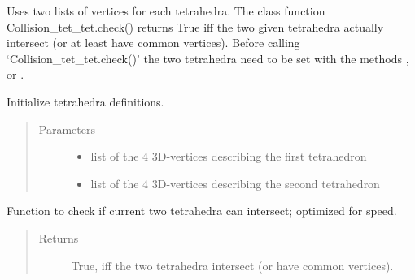 \documentclass[letterpaper,10pt,english]{sphinxmanual}
\begin{document}
Uses two lists of vertices for each tetrahedra. The class function Collision\_tet\_tet.check() returns True iff the two given tetrahedra actually intersect (or at least have common vertices).
Before calling ‘Collision\_tet\_tet.check()’ the two tetrahedra need to be set with the methods ,  or .

\begin{fulllineitems}
\label{\detokenize{pk_src.collision_tet_tet:pk_src.collision_tet_tet.Collision_tet_tet}}
Initialize tetrahedra definitions.
\begin{quote}\begin{description}
\item[{Parameters}] \leavevmode\begin{itemize}
\item {} 
 \textendash{} list of the 4 3D-vertices describing the first tetrahedron

\item {} 
 \textendash{} list of the 4 3D-vertices describing the second tetrahedron

\end{itemize}

\end{description}\end{quote}

\begin{fulllineitems}
\label{\detokenize{pk_src.collision_tet_tet:pk_src.collision_tet_tet.Collision_tet_tet.check}}
Function to check if current two tetrahedra can intersect; optimized for speed.
\begin{quote}\begin{description}
\item[{Returns}] \leavevmode
True, iff the two tetrahedra intersect (or have common vertices).

\end{description}\end{quote}

\end{fulllineitems}


\end{fulllineitems}
\end{document}
